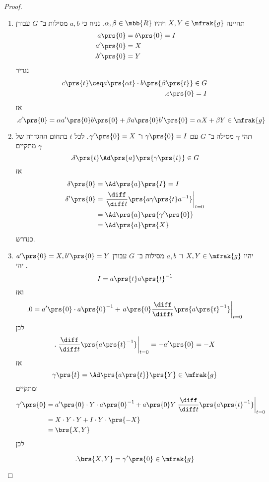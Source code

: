 \documentclass[10pt, twoside]{book}
\begin{document}
\begin{proof}
\begin{enumerate}
\item תהיינה
$X,Y \in \mfrak{g}$
ויהיו
$\alpha,\beta \in \mbb{R}$.
נניח כי
$a,b$
מסילות ב־%
$G$
עבורן
\begin{align*}
a\prs{0} &= b\prs{0} = I \\
a'\prs{0} &= X \\
\text{.} b'\prs{0} &= Y
\end{align*}
נגדיר
\begin{align*}
c\prs{t} \ceq a\prs{\alpha t} \cdot b\prs{\beta\prs{t}} \in G \\
\text{.} c\prs{0} = I
\end{align*}
אז
\[\text{.} c'\prs{0} = \alpha a'\prs{0} b\prs{0} + \beta a\prs{0} b'\prs{0} = \alpha X + \beta Y \in \mfrak{g} \]
\item תהי
$\gamma$
מסילה ב־%
$G$
עם
$\gamma\prs{0} = I$
ו־%
$\gamma'\prs{0} = X$.
לכל
$t$
בתחום ההגדרה של
$\gamma$
מתקיים
\[\text{.} \delta\prs{t} \Ad\prs{a} \prs{\gamma\prs{t}} \in G\]
אז
\begin{align*}
\delta\prs{0} &= \Ad\prs{a}\prs{I} = I \\
\delta'\prs{0} &= \left.\frac{\diff}{\diff t} \prs{a \gamma\prs{t} a^{-1}}\right|_{t=0} 
\\&=
\Ad\prs{a} \prs{\gamma'\prs{0}}
\\&=
\Ad\prs{a} \prs{X}
\end{align*}
כנדרש.

\item
יהיו
$X,Y \in \mfrak{g}$
ו־%
$a,b$
מסילות ב־%
$G$
עבורן
$a'\prs{0} = X, b'\prs{0} = Y$.
יהי
\[I = a\prs{t} a\prs{t}^{-1}\]
ואז
\[\text{.} 0 = a'\prs{0} \cdot a\prs{0}^{-1} + \left. a\prs{0} \frac{\diff}{\diff t}\prs{a\prs{t}^{-1}} \right|_{t=0}\]
לכן
\[\text{.} \left. \frac{\diff}{\diff t}\prs{a\prs{t}^{-1}}\right|_{t=0} = -a'\prs{0} = -X\]
אז
\[\gamma\prs{t} = \Ad\prs{a\prs{t}}\prs{Y} \in \mfrak{g}\]
ומתקיים
\begin{align*}
\gamma'\prs{0} &= a'\prs{0} \cdot Y \cdot a\prs{0}^{-1} + a\prs{0} Y \left. \frac{\diff}{\diff t}\prs{a\prs{t}^{-1}} \right|_{t=0}
\\&=
X \cdot Y \cdot Y + I \cdot Y \cdot \prs{-X}
\\&= \brs{X,Y}
\end{align*}
לכן
\begin{otherlanguage}{english}
\[\text{.} \brs{X,Y} = \gamma'\prs{0} \in \mfrak{g}\]
\end{otherlanguage}
\end{enumerate}
\end{proof}
\end{document}
